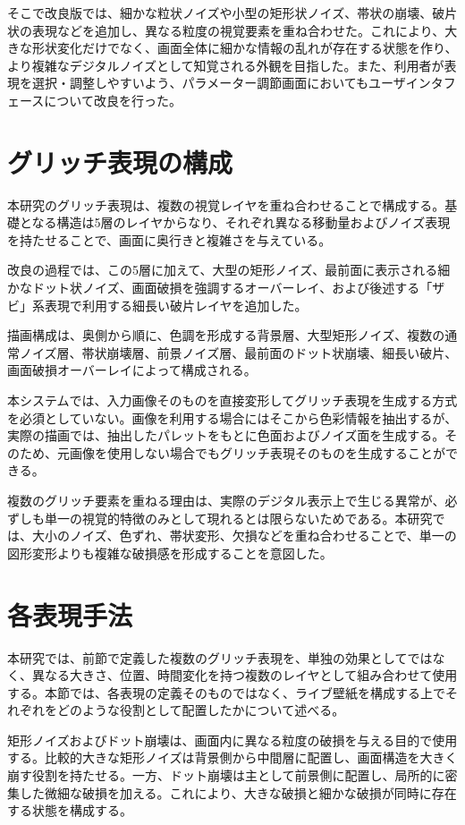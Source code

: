 そこで改良版では、細かな粒状ノイズや小型の矩形状ノイズ、帯状の崩壊、破片状の表現などを追加し、異なる粒度の視覚要素を重ね合わせた。これにより、大きな形状変化だけでなく、画面全体に細かな情報の乱れが存在する状態を作り、より複雑なデジタルノイズとして知覚される外観を目指した。また、利用者が表現を選択・調整しやすいよう、パラメーター調節画面においてもユーザインタフェースについて改良を行った。


\section{グリッチ表現の構成}

本研究のグリッチ表現は、複数の視覚レイヤを重ね合わせることで構成する。基礎となる構造は5層のレイヤからなり、それぞれ異なる移動量およびノイズ表現を持たせることで、画面に奥行きと複雑さを与えている。

改良の過程では、この5層に加えて、大型の矩形ノイズ、最前面に表示される細かなドット状ノイズ、画面破損を強調するオーバーレイ、および後述する「ザビ」系表現で利用する細長い破片レイヤを追加した。

描画構成は、奥側から順に、色調を形成する背景層、大型矩形ノイズ、複数の通常ノイズ層、帯状崩壊層、前景ノイズ層、最前面のドット状崩壊、細長い破片、画面破損オーバーレイによって構成される。

本システムでは、入力画像そのものを直接変形してグリッチ表現を生成する方式を必須としていない。画像を利用する場合にはそこから色彩情報を抽出するが、実際の描画では、抽出したパレットをもとに色面およびノイズ面を生成する。そのため、元画像を使用しない場合でもグリッチ表現そのものを生成することができる。

複数のグリッチ要素を重ねる理由は、実際のデジタル表示上で生じる異常が、必ずしも単一の視覚的特徴のみとして現れるとは限らないためである。本研究では、大小のノイズ、色ずれ、帯状変形、欠損などを重ね合わせることで、単一の図形変形よりも複雑な破損感を形成することを意図した。


\section{各表現手法}

本研究では、前節で定義した複数のグリッチ表現を、単独の効果としてではなく、異なる大きさ、位置、時間変化を持つ複数のレイヤとして組み合わせて使用する。本節では、各表現の定義そのものではなく、ライブ壁紙を構成する上でそれぞれをどのような役割として配置したかについて述べる。

矩形ノイズおよびドット崩壊は、画面内に異なる粒度の破損を与える目的で使用する。比較的大きな矩形ノイズは背景側から中間層に配置し、画面構造を大きく崩す役割を持たせる。一方、ドット崩壊は主として前景側に配置し、局所的に密集した微細な破損を加える。これにより、大きな破損と細かな破損が同時に存在する状態を構成する。

